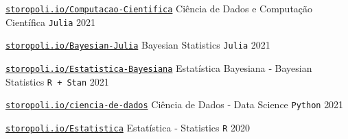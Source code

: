 

\begin{cventries}

  \cventry
    {\href{https://storopoli.io/Computacao-Cientifica/}{\texttt{storopoli.io/Computacao-Cientifica}}} %
    {Ciência de Dados e Computação Científica} %
    {\texttt{Julia}} %
    {2021} %
    {}

  \cventry
    {\href{https://storopoli.io/Bayesian-Julia/}{\texttt{storopoli.io/Bayesian-Julia}}} %
    {Bayesian Statistics} %
    {\texttt{Julia}} %
    {2021} %
    {}

  \cventry
    {\href{https://storopoli.io/Estatistica-Bayesiana/}{\texttt{storopoli.io/Estatistica‑Bayesiana}}} %
    {Estatística Bayesiana ‑ Bayesian Statistics} %
    {\texttt{R + Stan}} %
    {2021} %
    {}

  \cventry
    {\href{https://storopoli.io/ciencia-de-dados}{\texttt{storopoli.io/ciencia-de-dados}}} %
    {Ciência de Dados ‑ Data Science} %
    {\texttt{Python}} %
    {2021} %
    {}

  \cventry
    {\href{https://storopoli.io/Estatistica/}{\texttt{storopoli.io/Estatistica}}} %
    {Estatística ‑ Statistics} %
    {\texttt{R}} %
    {2020} %
    {}

\end{cventries}
